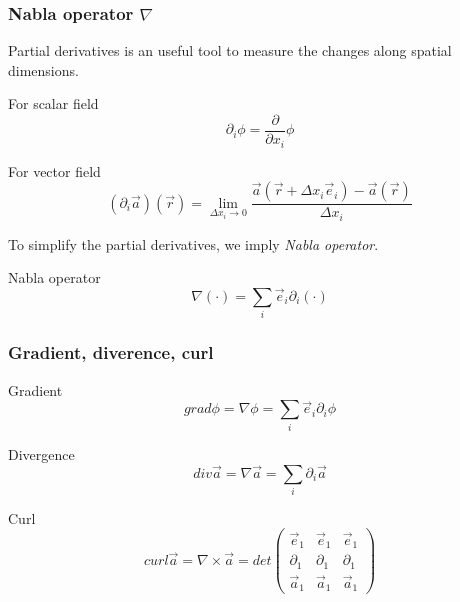 \documentclass{beamer}
\begin{document}
\begin{frame}
    \frametitle{Nabla operator $\nabla$}
    Partial derivatives is an useful tool to measure the changes along spatial dimensions.

    For scalar field
    \begin{equation}
        \partial_{i} \phi = \frac{\partial}{\partial x_{i}} \phi
    \end{equation}

    For vector field
    \begin{equation}
        (\partial_{i} \vec{a}) (\vec{r}) = \lim_{\Delta x_{i} \rightarrow 0} \frac{\vec{a}(\vec{r} + \Delta x_{i} \vec{e}_{i}) - \vec{a}(\vec{r})}{\Delta x_{i}}
    \end{equation}

    To simplify the partial derivatives, we imply \emph{Nabla operator}.
    \begin{alertblock}{Nabla operator}
        \begin{equation}
            \nabla (\cdot) = \sum_{i} \vec{e}_{i} \partial_{i} (\cdot)
        \end{equation}
    \end{alertblock}

\end{frame}

\begin{frame}
    \frametitle{Gradient, diverence, curl}

    \begin{block}{Gradient}
        \begin{equation}
            grad \phi = \nabla \phi = \sum_{i} \vec{e}_{i} \partial_{i} \phi
        \end{equation}
    \end{block}

    \begin{block}{Divergence}
        \begin{equation}
            div \vec{a} = \nabla \vec{a} = \sum_{i} \partial_{i} \vec{a}
        \end{equation}
    \end{block}

    \begin{block}{Curl}
        \begin{equation}
            curl \vec{a} = \nabla \times \vec{a} = det
            \begin{pmatrix}
                \vec{e}_{1}  & \vec{e}_{1}  & \vec{e}_{1}  \\
                \partial_{1} & \partial_{1} & \partial_{1} \\
                \vec{a}_{1}  & \vec{a}_{1}  & \vec{a}_{1}
            \end{pmatrix}
        \end{equation}
    \end{block}

\end{frame}
\end{document}
